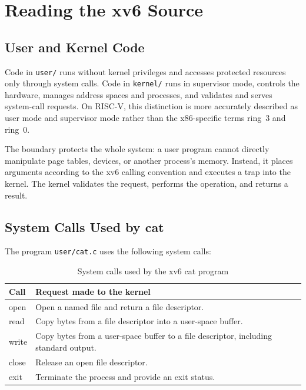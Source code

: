 \documentclass[12pt]{article}
\newcommand{\commandname}[1]{\texttt{#1}}
\begin{document}
\section{Reading the xv6 Source}

\subsection{User and Kernel Code}

Code in \commandname{user/} runs without kernel privileges and accesses protected resources only through system calls. Code in \commandname{kernel/} runs in supervisor mode, controls the hardware, manages address spaces and processes, and validates and serves system-call requests. On RISC-V, this distinction is more accurately described as user mode and supervisor mode rather than the x86-specific terms ring~3 and ring~0.

The boundary protects the whole system: a user program cannot directly manipulate page tables, devices, or another process's memory. Instead, it places arguments according to the xv6 calling convention and executes a trap into the kernel. The kernel validates the request, performs the operation, and returns a result.

\subsection{System Calls Used by cat}

The program \commandname{user/cat.c} uses the following system calls:

\begin{table}[H]
    \centering
    \caption{System calls used by the xv6 cat program}
    \begin{tabular}{>{\ttfamily}p{} p{}}
        \toprule
        \normalfont\textbf{Call} & \textbf{Request made to the kernel} \\
        \midrule
        open & Open a named file and return a file descriptor. \\
        read & Copy bytes from a file descriptor into a user-space buffer. \\
        write & Copy bytes from a user-space buffer to a file descriptor, including standard output. \\
        close & Release an open file descriptor. \\
        exit & Terminate the process and provide an exit status. \\
        \bottomrule
    \end{tabular}
\end{table}
\end{document}
